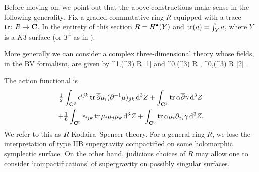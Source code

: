 \documentclass[../main.tex]{subfiles}
\begin{document}
Before moving on, we point out that the above constructions make sense in the following generality.
Fix a graded commutative ring $R$ equipped with a trace $\operatorname{tr} \colon R \to \mathbf{C}$.
In the entirety of this section $R = H^{\bullet}(Y)$ and $\operatorname{tr}(a) = \int_{Y} a$, where $Y$ is a $K3$ surface (or $T^4$ as in \cite{CP}).

More generally we can consider a complex three-dimensional theory whose fields, in the BV formalism, are given by
\beqn
\mu \in \PV^{1,\bu}(\C^3) \otimes R [1]
\eeqn
and 
\beqn
\alpha \in \Omega^{0,\bu}(\C^3) \otimes R , \quad \gamma \in \Omega^{0,\bu}(\C^3) \otimes R [2] .
\eeqn

The action functional is
\begin{multline}\label{eqn:Aaction}
	\tfrac{1}{2}\int_{\mathbf{C}^{3}}   {\epsilon}^{ijk} \operatorname{tr} \overline{\partial} \mu_{i} (\partial^{-1}  \mu)_{jk} \, \mathrm{d}^3 Z + \int_{\mathbf{C}^{3}}  \operatorname{tr} \alpha \overline{\partial} \gamma \, \mathrm{d}^3 Z
	\\
	+ \tfrac{1}{6} \int_{\mathbf{C}^{3}}  {\epsilon}_{ijk} \operatorname{tr} \mu_{i}\mu_{j} \mu_{k} \, \mathrm{d}^3 Z + \int_{\mathbf{C}^{3}} \operatorname{tr}  \alpha \mu_i \partial_{z_i}  \gamma \, \mathrm{d}^3 Z.
\end{multline} 
We refer to this as $R$-Kodaira--Spencer theory.
For a general ring $R$, we lose the interpretation of type IIB supergravity compactified on some holomorphic symplectic surface.
On the other hand, judicious choices of $R$ may allow one to consider `compactifications' of supergravity on possibly singular surfaces.
\end{document}
